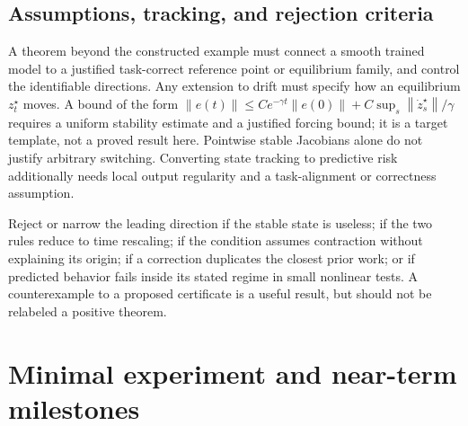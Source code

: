 \documentclass[11pt,a4paper]{article}
\newcommand{\norm}[1]{\left\lVert #1\right\rVert}
\begin{document}
\subsection{Assumptions, tracking, and rejection criteria}
A theorem beyond the constructed example must connect a smooth trained
model to a justified task-correct reference point or equilibrium family,
and control the identifiable directions. Any extension to drift must specify how an
equilibrium $z_t^\star$ moves. A bound of the form
$\norm{e(t)}\le C e^{-\gamma t}\norm{e(0)}+
C\sup_s\norm{\dot z_s^\star}/\gamma$
requires a uniform stability estimate and a justified forcing bound;
it is a target template, not a proved result here. Pointwise stable
Jacobians alone do not justify arbitrary switching. Converting state
tracking to predictive risk additionally needs local output regularity
and a task-alignment or correctness assumption.

Reject or narrow the leading direction if the stable state is useless;
if the two rules reduce to time rescaling; if the condition assumes
contraction without explaining its origin; if a correction duplicates
the closest prior work; or if predicted behavior fails inside its stated
regime in small nonlinear tests. A counterexample to a proposed certificate
is a useful result, but should not be relabeled a positive theorem.

\section{Minimal experiment and near-term milestones}
\end{document}
